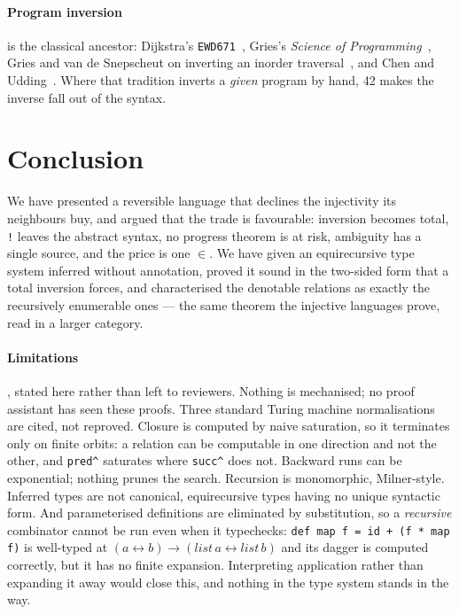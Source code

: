 \documentclass[runningheads,envcountsame]{llncs}
\newcommand{\iso}{\leftrightarrow}
\begin{document}
\paragraph{Program inversion} is the classical ancestor: Dijkstra's
\texttt{EWD671}~\cite{ewd671}, Gries's \emph{Science of Programming}~\cite{gries},
Gries and van de Snepscheut on inverting an inorder traversal~\cite{griessnep}, and
Chen and Udding~\cite{chen}. Where that tradition inverts a \emph{given} program by
hand, 42 makes the inverse fall out of the syntax.

\section{Conclusion}

We have presented a reversible language that declines the injectivity its
neighbours buy, and argued that the trade is favourable: inversion becomes total,
\texttt{!} leaves the abstract syntax, no progress theorem is at risk, ambiguity
has a single source, and the price is one $\in$. We have given an equirecursive
type system inferred without annotation, proved it sound in the two-sided form that
a total inversion forces, and characterised the denotable relations as exactly the
recursively enumerable ones --- the same theorem the injective languages prove, read
in a larger category.

\paragraph{Limitations}, stated here rather than left to reviewers. Nothing is
mechanised; no proof assistant has seen these proofs. Three standard Turing machine
normalisations are cited, not reproved. Closure is computed by naive saturation, so
it terminates only on finite orbits: a relation can be computable in one direction
and not the other, and \texttt{pred\textasciicircum{}} saturates where \texttt{succ\textasciicircum{}} does not.
Backward runs can be exponential; nothing prunes the search. Recursion is
monomorphic, Milner-style. Inferred types are not canonical, equirecursive types
having no unique syntactic form. And parameterised definitions are eliminated by
substitution, so a \emph{recursive} combinator cannot be run even when it
typechecks: \texttt{def map f = id + (f * map f)} is well-typed at
$(a \iso b) \to (\mathit{list}\,a \iso \mathit{list}\,b)$ and its dagger is computed
correctly, but it has no finite expansion. Interpreting application rather than
expanding it away would close this, and nothing in the type system stands in the
way.
\end{document}
